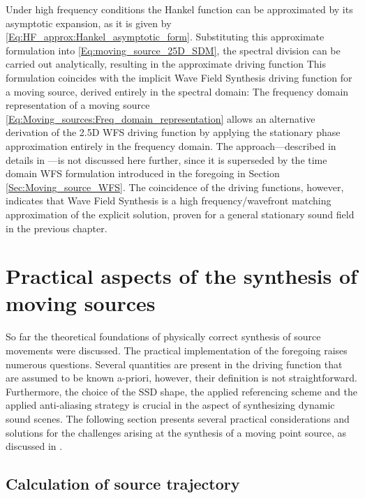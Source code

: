 Under high frequency conditions the Hankel function can be approximated by its asymptotic expansion, as it is given by \eqref{Eq:HF_approx:Hankel_asymptotic_form}.
Substituting this approximate formulation into \eqref{Eq:moving_source_25D_SDM}, the spectral division can be carried out analytically, resulting in the approximate driving function
This formulation coincides with the implicit Wave Field Synthesis driving function for a moving source, derived entirely in the spectral domain: 
The frequency domain representation of a moving source \eqref{Eq:Moving_sources:Freq_domain_representation} allows an alternative derivation of the 2.5D WFS driving function by applying the stationary phase approximation entirely in the frequency domain.
The approach---described in details in \cite{firtha2015sound}---is not discussed here further, since it is superseded by the time domain WFS formulation introduced in the foregoing in Section \ref{Sec:Moving_source_WFS}.
The coincidence of the driving functions, however, indicates that Wave Field Synthesis is a high frequency/wavefront matching approximation of the explicit solution, proven for a general stationary sound field in the previous chapter.

\section{Practical aspects of the synthesis of moving sources}

So far the theoretical foundations of physically correct synthesis of source movements were discussed.
The practical implementation of the foregoing raises numerous questions.
Several quantities are present in the driving function that are assumed to be known a-priori, however, their definition is not straightforward.
Furthermore, the choice of the SSD shape, the applied referencing scheme and the applied anti-aliasing strategy is crucial in the aspect of synthesizing dynamic sound scenes.
The following section presents several practical considerations and solutions for the challenges arising at the synthesis of a moving point source, as discussed in  \cite{Firtha2018_daga_moving_source}.

\subsection{Calculation of source trajectory}
\label{Sec:Trajectory_calc}

